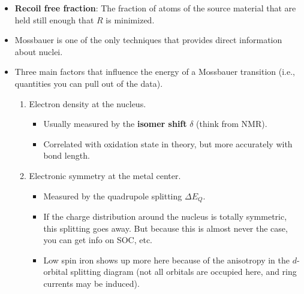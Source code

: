 \documentclass[../notes.tex]{subfiles}
\begin{document}
\begin{itemize}
\begin{itemize}
        \begin{itemize}
            \item A Doppler shift is relevant to the experimental setup of Mossbauer.
            \item Essentially, you literally hook up your emitter to a speaker and vibrate it at a hertz frequency to add or subtract a tiny bit of energy to/from the gamma rays.
            \item This setup allows you to get resolution in a very small window around a certain excitation energy of your nucleus.
            \item It also leads to the common unit of \si[per-mode=symbol]{\milli\meter\per\second}.
        \end{itemize}
    \end{itemize}
    \item \textbf{Recoil free fraction}: The fraction of atoms of the source material that are held still enough that $R$ is minimized.
    \item Mossbauer is one of the only techniques that provides direct information about nuclei.
    \item Three main factors that influence the energy of a Mossbauer transition (i.e., quantities you can pull out of the data).
    \begin{enumerate}
        \item Electron density at the nucleus.
        \begin{itemize}
            \item Usually measured by the \textbf{isomer shift} $\delta$ (think \si{\ppm} from NMR).
            \item Correlated with oxidation state in theory, but more accurately with bond length.
        \end{itemize}
        \item Electronic symmetry at the metal center.
        \begin{itemize}
            \item Measured by the quadrupole splitting $\Delta E_Q$.
            \item If the charge distribution around the nucleus is totally symmetric, this splitting goes away. But because this is almost never the case, you can get info on SOC, etc.
            \item Low spin iron shows up more here because of the anisotropy in the $d$-orbital splitting diagram (not all orbitals are occupied here, and ring currents may be induced).

\end{itemize}
\end{enumerate}
\end{itemize}
\end{document}
